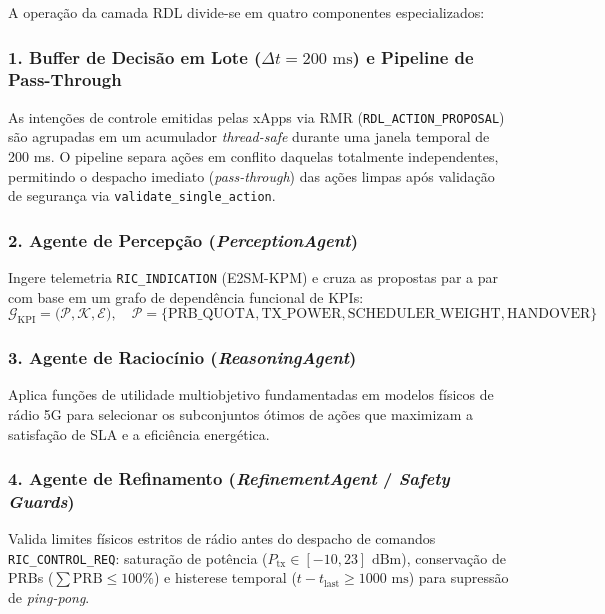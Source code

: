 \documentclass[12pt]{article}
\begin{document}
A operação da camada RDL divide-se em quatro componentes especializados:

\subsubsection{1. Buffer de Decisão em Lote ($\Delta t = 200\text{ ms}$) e Pipeline de Pass-Through}
As intenções de controle emitidas pelas xApps via RMR (\texttt{RDL\_ACTION\_PROPOSAL}) são agrupadas em um acumulador \textit{thread-safe} durante uma janela temporal de 200 ms. O pipeline separa ações em conflito daquelas totalmente independentes, permitindo o despacho imediato (\textit{pass-through}) das ações limpas após validação de segurança via \texttt{validate\_single\_action}.

\subsubsection{2. Agente de Percepção (\textit{PerceptionAgent})}
Ingere telemetria \texttt{RIC\_INDICATION} (E2SM-KPM) e cruza as propostas par a par com base em um grafo de dependência funcional de KPIs:
\begin{equation}
    \mathcal{G}_{\text{KPI}} = \big( \mathcal{P}, \mathcal{K}, \mathcal{E} \big), \quad \mathcal{P} = \{\text{PRB\_QUOTA}, \text{TX\_POWER}, \text{SCHEDULER\_WEIGHT}, \text{HANDOVER}\}
\end{equation}

\subsubsection{3. Agente de Raciocínio (\textit{ReasoningAgent})}
Aplica funções de utilidade multiobjetivo fundamentadas em modelos físicos de rádio 5G para selecionar os subconjuntos ótimos de ações que maximizam a satisfação de SLA e a eficiência energética.

\subsubsection{4. Agente de Refinamento (\textit{RefinementAgent} / \textit{Safety Guards})}
Valida limites físicos estritos de rádio antes do despacho de comandos \texttt{RIC\_CONTROL\_REQ}: saturação de potência ($P_{\text{tx}} \in [-10, 23]\text{ dBm}$), conservação de PRBs ($\sum \text{PRB} \le 100\%$) e histerese temporal ($t - t_{\text{last}} \ge 1000\text{ ms}$) para supressão de \textit{ping-pong}.

\end{document}
